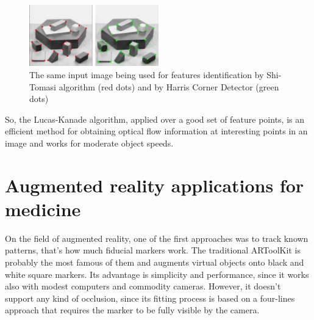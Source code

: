 \documentclass[msc, a4paper, classic, en]{ufbathesis}
\begin{document}
\begin{figure}
\centering
\includegraphics[width=0.5\textwidth]{images/shi-harris.png}
\caption{The same input image being used for features identification by Shi-Tomasi algorithm (red dots) and by Harris Corner Detector (green dots)}
\label{fig:shi-harris}
\end{figure}

So, the Lucas-Kanade algorithm, applied over a good set of feature points, is an efficient method for obtaining optical flow information at interesting points in an image and works for moderate object speeds.


\section{Augmented reality applications for medicine}

On the field of augmented reality, one of the first approaches was to track known patterns, that's how much fiducial markers work. The traditional ARToolKit \cite{artoolkit} is probably the most famous of them and augments virtual objects onto black and white square markers. Its advantage is simplicity and performance, since it works also with modest computers and commodity cameras. However, it doesn't support any kind of occlusion, since its fitting process is based on a four-lines approach that requires the marker to be fully visible by the camera.
\end{document}
